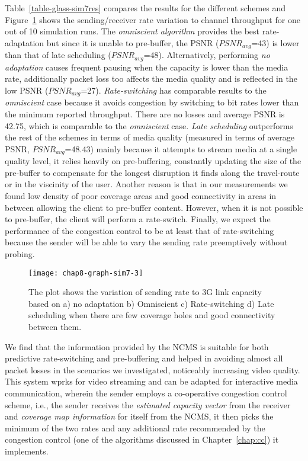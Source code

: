 Table~\ref{table-glass-sim7res} compares the results for the different schemes
and Figure~\ref{fig:glass:sim7res} shows the sending/receiver rate variation
to channel throughput for one out of 10 simulation runs. The \emph{omniscient
algorithm}  provides the best rate-adaptation but since it is unable to 
pre-buffer, the PSNR ($PSNR_{avg}$=43) is lower than that of late scheduling
($PSNR_{avg}$=48). Alternatively, performing \emph{no adaptation} causes
frequent pausing when the capacity is lower than the media rate, additionally
packet loss too affects the media quality and is reflected in the low PSNR
($PSNR_{avg}$=27). \emph{Rate-switching} has comparable results to the
\emph{omniscient} case because it avoids congestion by switching to bit rates
lower than the minimum reported throughput. There are no losses  and average
PSNR is 42.75, which is comparable to the \emph{omniscient} case. \emph{Late
scheduling} outperforms the rest of the schemes in terms of media quality
(measured in terms of average PSNR, $PSNR_{avg}$=48.43) mainly because it
attempts to stream media at a single quality level, it relies heavily on 
pre-buffering, constantly updating the size of the pre-buffer to compensate for
the longest disruption it finds along the travel-route or in the viscinity of
the user. Another reason is that in our measurements we found low density of
poor coverage areas and good connectivity in areas in between allowing the
client to pre-buffer content. However, when it is not possible to pre-buffer,
the client will perform a rate-switch. Finally, we expect the performance of
the congestion control to be at least that of rate-switching because the
sender will be able to vary the sending rate preemptively without probing.

\begin{figure}
\texttt{[image: chap8-graph-sim7-3]}
  \caption{The plot shows the variation of sending rate to 3G link capacity
  based on a) no adaptation b) Omniscient c) Rate-switching d) Late scheduling
  when there are few coverage holes and good connectivity between them.}
\label{fig:glass:sim7res}
\end{figure}


We find that the information provided by the NCMS is suitable for both
predictive rate-switching and  pre-buffering and helped in avoiding almost all
packet losses in the scenarios we investigated, noticeably increasing video
quality. This system wprks for video streaming and can be adapted for
interactive media communication, wherein the sender employs a co-operative
congestion control scheme, i.e., the sender receives the \emph{estimated
capacity vector} from the receiver and \emph{coverage map information} for
itself from the NCMS, it then picks the minimum of the two rates and any
additional rate recommended by the congestion control (one of the algorithms
discussed in Chapter~\ref{chap:cc}) it implements.

